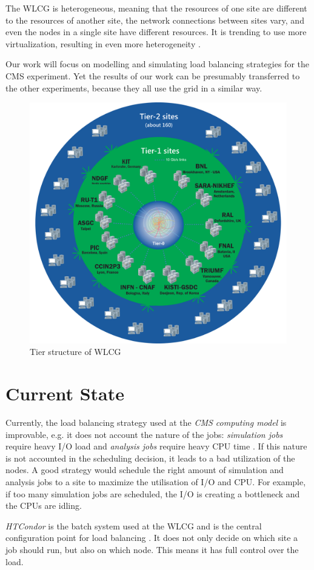 The WLCG is heterogeneous, meaning that the resources of one site are different to the resources of another site, the network connections between sites vary, and even the nodes in a single site have different resources. It is trending to use more virtualization, resulting in even more heterogeneity \cite{wlcg_update}.

Our work will focus on modelling and simulating load balancing strategies for the CMS experiment. Yet the results of our work can be presumably transferred to the other experiments, because they all use the grid in a similar way.

	\begin{figure}
		\centering
		\includegraphics[width=0.65\linewidth]{images/WLCG}
		\caption[]{Tier structure of WLCG \cite{wlcg_tiers}}
		\label{fig:wlcg}
	\end{figure}
	

\section{Current State}
Currently, the load balancing strategy used at the \textit{CMS computing model} is improvable, e.g. it does not account the nature of the jobs: \textit{simulation jobs} require heavy I/O load and \textit{analysis jobs} require heavy CPU time \cite{1742-6596-331-7-072038}. If this nature is not accounted in the scheduling decision, it leads to a bad utilization of the nodes. A good strategy would schedule the right amount of simulation and analysis jobs to a site to maximize the utilisation of I/O and CPU. For example, if too many simulation jobs are scheduled, the I/O is creating a bottleneck and the CPUs are idling. 

\textit{HTCondor} is the batch system used at the WLCG and is the central configuration point for load balancing \cite{wlcg_update}.
It does not only decide on which site a job should run, but also on which node. This means it has full control over the load.

